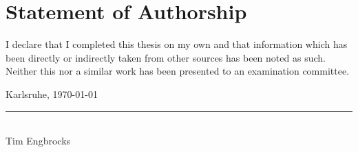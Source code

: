 \chapter*{Statement of Authorship}
\thispagestyle{empty}

\vspace*{4cm}




I declare that I completed this thesis on my own and that information which has been directly or indirectly taken from other sources has been noted as such.
Neither this nor a similar work has been presented to an examination committee.

\bigskip
\bigskip
\bigskip

Karlsruhe, \today

\bigskip
\bigskip
\bigskip

\rule{0.3\textwidth}{0.4pt}\\
Tim Engbrocks